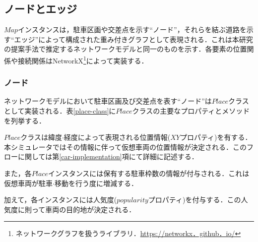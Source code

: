 \subsection{ノードとエッジ}
$Map$インスタンスは，駐車区画や交差点を示す``ノード''，それらを結ぶ道路を示す``エッジ''によって構成された重み付きグラフとして表現される．これは本研究の提案手法で推定するネットワークモデルと同一のものを示す．各要素の位置関係や接続関係はNetworkX\footnote{ネットワークグラフを扱うライブラリ．\url{https://networkx．github．io/}}によって実装する．

\subsubsection{ノード}
ネットワークモデルにおいて駐車区画及び交差点を表す``ノード''は$Place$クラスとして実装される．表\ref{place-class}に$Place$クラスの主要なプロパティとメソッドを列挙する．


$Place$クラスは緯度$\cdot$経度によって表現される位置情報($XY$プロパティ)を有する．本シミュレータではその情報に伴って仮想車両の位置情報が決定される．このフローに関しては第\ref{car-implementation}項にて詳細に記述する．

また，各$Place$インスタンスには保有する駐車枠数の情報が付与される．これは仮想車両が駐車$\cdot$移動を行う度に増減する．

加えて，各インスタンスには人気度($popularity$プロパティ)を付与する．この人気度に則って車両の目的地が決定される．


